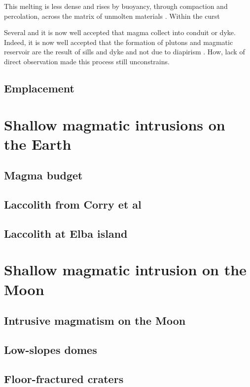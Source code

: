 This melting is  less dense and rises by  buoyancy, through compaction
and   percolation,   across   the   matrix   of   unmolten   materials
\citep{McKenzy:1984bo,McKenzie:1985jq}.  Within the curst


Several and it is now well accepted that magma collect into conduit or
dyke. Indeed,  it is now well  accepted that the formation  of plutons
and magmatic reservoir are the result of sills and dyke and not due to
diapirism .  How,  lack of direct observation made  this process still
unconstrains.

\subsection{Emplacement}

\section{Shallow magmatic intrusions on the Earth}
\label{sec:shall-magm-intr}

\subsection{Magma budget}
\label{sec:magma-budget}

\subsection{Laccolith from Corry et al}
\label{sec:laccolith-from-corry}

\subsection{Laccolith at Elba island}
\label{sec:laccolith-at-elba}

\section{Shallow magmatic intrusion on the Moon}
\label{sec:shall-magm-intr-1}

\subsection{Intrusive magmatism on the Moon}
\label{sec:intr-magm-moon}

\subsection{Low-slopes domes}
\label{sec:low-slopes-domes}

\subsection{Floor-fractured craters}
\label{sec:floor-fract-crat}





